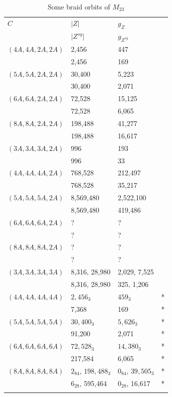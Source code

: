 \documentclass[12pt,a4paper]{article}
\numberwithin{equation}{section}
\numberwithin{table}{section}
\begin{document}
%
\begin{table}[!htbp]
\centering
\footnotesize
\captionsetup{font=footnotesize}
\caption{Some braid orbits of $M_{23}$}
\label{tab:Data_BraidOrbitsOfM23}
\begin{tabular}{llll}
\hline\noalign{\smallskip}
$C$ & $ \vert Z \vert $      & $g_Z$ & \\
    & $ \vert Z^{sy} \vert $ & $g_{Z^{sy}}$ & \\
\noalign{\smallskip}\hline\noalign{\smallskip}
$(4A,4A,2A,2A)$ & 2,456 & 447 & \\
                & 2,456 & 169 & \\
$(5A,5A,2A,2A)$ & 30,400 & 5,223 & \\
                & 30,400 & 2,071 & \\
$(6A,6A,2A,2A)$ & 72,528 & 15,125 & \\
                & 72,528 & 6,065 & \\
$(8A,8A,2A,2A)$ & 198,488 & 41,277 & \\
                & 198,488 & 16,617 & \\
\noalign{\smallskip}\hline\noalign{\smallskip}
$(3A,3A,3A,2A)$ & 996 & 193 & \\
                & 996 & 33 & \\
$(4A,4A,4A,2A)$ & 768,528 & 212,497 & \\
                & 768,528 & 35,217 & \\
$(5A,5A,5A,2A)$ & 8,569,480 & 2,522,100 & \\
                & 8,569,480 & 419,486 & \\
$(6A,6A,6A,2A)$ & ? & ? & \\
                & ? & ? & \\
$(8A,8A,8A,2A)$ & ? & ? & \\
                & ? & ? & \\
\noalign{\smallskip}\hline\noalign{\smallskip}
$(3A,3A,3A,3A)$ & 8,316, 28,980 & 2,029, 7,525 & \\
                & 8,316, 28,980 & 325, 1,206 & \\
$(4A,4A,4A,4A)$ & $2,456_3$ & $459_3$ & *\\
                & 7,368     & 169 & *\\
$(5A,5A,5A,5A)$ & $30,400_3$ & $5,626_3$ & *\\
                & 91,200 & 2,071 & *\\
$(6A,6A,6A,6A)$ & $72,528_3$ & $14,380_3$ & *\\
                & 217,584 & 6,065 & *\\
$(8A,8A,8A,8A)$ & $2_{84}$, $198,488_3$ & $0_{84}$, $39,505_3$ & *\\
                & $6_{28}$, 595,464 & $0_{28}$, 16,617 & *\\
\noalign{\smallskip}\hline
\end{tabular}
\end{table}
\end{document}
